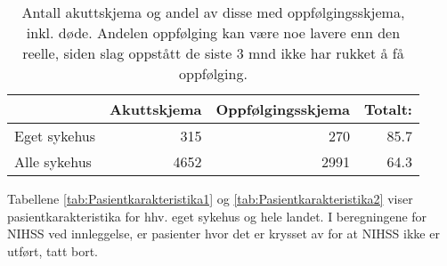 \documentclass [norsk,a4paper,twoside]{article}\usepackage[]{graphicx}\usepackage[]{color}
\begin{document}
\begin{table}[ht]
\centering
\begin{tabular}{lrrr}
  \hline
 & Akuttskjema & Oppfølgingsskjema & Totalt: \\ 
  \hline
Eget sykehus & 315 & 270 & 85.7 \\ 
  Alle sykehus & 4652 & 2991 & 64.3 \\ 
   \hline
\end{tabular}
\caption{Antall akuttskjema og andel av disse med oppfølgingsskjema, inkl. døde.
		Andelen oppfølging kan være noe lavere enn den reelle, siden slag oppstått
		de siste 3 mnd ikke har rukket å få oppfølging.} 
\label{tab:AndelOppfEget}
\end{table}


Tabellene \ref{tab:Pasientkarakteristika1} og \ref{tab:Pasientkarakteristika2} viser pasientkarakteristika  
for hhv. eget sykehus og hele landet. I beregningene for NIHSS ved innleggelse, er pasienter hvor det 
er krysset av for at NIHSS ikke er utført, tatt bort.

\clearpage
\end{document}
